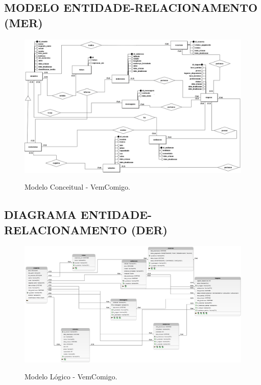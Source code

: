 \begin{anexosenv}


\begin{landscape}

	\chapter{MODELO ENTIDADE-RELACIONAMENTO (MER)}
	
	\begin{figure}[htb!]
		\centering
		\caption{Modelo Conceitual - VemComigo.}
		\includegraphics[width=1.45\textwidth]{img/ModeloConceitualIntegradoredit.png} 
		\label{fig:modelo_conceitual_banco}
	\end{figure}
	
\end{landscape}


\begin{landscape}
	
	\chapter{DIAGRAMA ENTIDADE-RELACIONAMENTO (DER)}
	
	\begin{figure}[htb!]
		\centering
		\caption{Modelo Lógico - VemComigo.}
		\includegraphics[width=1.45\textwidth]{img/ModeloLogicoIntegradoredit.png}
		\label{fig:modelo_logico_banco}
	\end{figure}
	

\end{landscape}
\end{anexosenv}
